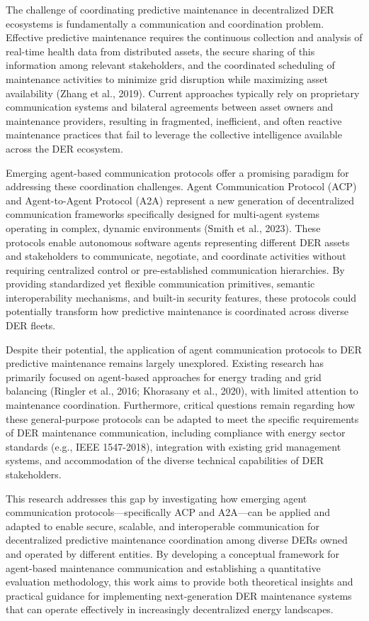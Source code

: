 The challenge of coordinating predictive maintenance in decentralized DER ecosystems is fundamentally a communication and coordination problem. Effective predictive maintenance requires the continuous collection and analysis of real-time health data from distributed assets, the secure sharing of this information among relevant stakeholders, and the coordinated scheduling of maintenance activities to minimize grid disruption while maximizing asset availability (Zhang et al., 2019). Current approaches typically rely on proprietary communication systems and bilateral agreements between asset owners and maintenance providers, resulting in fragmented, inefficient, and often reactive maintenance practices that fail to leverage the collective intelligence available across the DER ecosystem.

Emerging agent-based communication protocols offer a promising paradigm for addressing these coordination challenges. Agent Communication Protocol (ACP) and Agent-to-Agent Protocol (A2A) represent a new generation of decentralized communication frameworks specifically designed for multi-agent systems operating in complex, dynamic environments (Smith et al., 2023). These protocols enable autonomous software agents representing different DER assets and stakeholders to communicate, negotiate, and coordinate activities without requiring centralized control or pre-established communication hierarchies. By providing standardized yet flexible communication primitives, semantic interoperability mechanisms, and built-in security features, these protocols could potentially transform how predictive maintenance is coordinated across diverse DER fleets.

Despite their potential, the application of agent communication protocols to DER predictive maintenance remains largely unexplored. Existing research has primarily focused on agent-based approaches for energy trading and grid balancing (Ringler et al., 2016; Khorasany et al., 2020), with limited attention to maintenance coordination. Furthermore, critical questions remain regarding how these general-purpose protocols can be adapted to meet the specific requirements of DER maintenance communication, including compliance with energy sector standards (e.g., IEEE 1547-2018), integration with existing grid management systems, and accommodation of the diverse technical capabilities of DER stakeholders.

This research addresses this gap by investigating how emerging agent communication protocols—specifically ACP and A2A—can be applied and adapted to enable secure, scalable, and interoperable communication for decentralized predictive maintenance coordination among diverse DERs owned and operated by different entities. By developing a conceptual framework for agent-based maintenance communication and establishing a quantitative evaluation methodology, this work aims to provide both theoretical insights and practical guidance for implementing next-generation DER maintenance systems that can operate effectively in increasingly decentralized energy landscapes.

